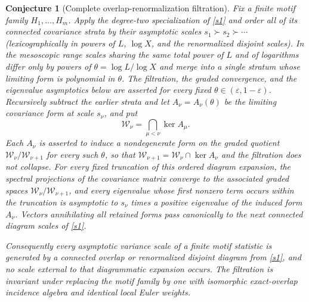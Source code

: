 \documentclass[11pt]{article}
\newtheorem{conjecture}{Conjecture}
\theoremstyle{definition}
\newcommand{\eps}{\varepsilon}
\begin{document}
\begin{conjecture}[Complete overlap-renormalization filtration]\label{s2}
Fix a finite motif family $H_1,\ldots,H_m$.  Apply the degree-two specialization of
\cref{s1} and order all of its connected covariance strata by their asymptotic scales
$s_1\succ s_2\succ\cdots$ (lexicographically in powers of $L$, $\log X$, and the
renormalized disjoint scales).  In the mesoscopic range scales sharing the same total
power of $L$ and of logarithms differ only by powers of $\theta=\log L/\log X$ and
merge into a single stratum whose limiting form is polynomial in $\theta$.  The filtration, the graded convergence, and the eigenvalue asymptotics below are asserted for every fixed $\theta\in(\eps,1-\eps)$. Recursively subtract the earlier strata and let $A_\nu=A_\nu(\theta)$ be the limiting covariance form at scale $s_\nu$, and put
\[
 \mathcal W_\nu=\bigcap_{\mu<\nu}\ker A_\mu.
\]
Each $A_\nu$ is asserted to induce a nondegenerate form on the graded quotient $\mathcal W_\nu/\mathcal W_{\nu+1}$ for every such $\theta$, so that $\mathcal W_{\nu+1}=\mathcal W_\nu\cap\ker A_\nu$ and the filtration does not collapse.
For every fixed truncation of this ordered diagram expansion, the spectral projections
of the covariance matrix converge to the associated graded spaces
$\mathcal W_\nu/\mathcal W_{\nu+1}$, and every eigenvalue whose first nonzero term occurs
within the truncation is asymptotic to $s_\nu$ times a positive eigenvalue of the induced
form $A_\nu$.  Vectors annihilating all retained forms pass canonically to the next
connected diagram scales of \cref{s1}.

Consequently every asymptotic variance scale of a finite motif statistic is generated by
a connected overlap or renormalized disjoint diagram from \cref{s1}, and no scale
external to that diagrammatic expansion occurs.  The filtration is invariant under replacing the
motif family by one with isomorphic exact-overlap incidence algebra and identical local
Euler weights.
\end{conjecture}
\end{document}
